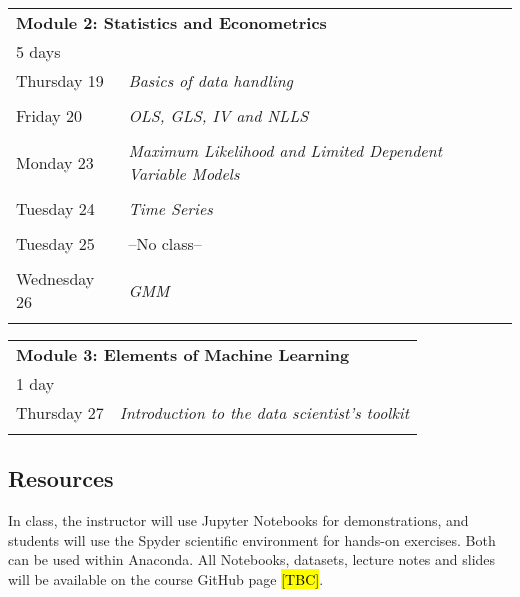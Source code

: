 \documentclass{article}
\numberwithin{equation}{section}
\begin{document}
\begin{center}
        \begin{tabular}{| p{2.5cm} | p{12.5cm} |}
    \hline
    \multicolumn{2}{|l|}{\textbf{Module 2: Statistics and Econometrics}} \\
    \multicolumn{2}{|l|}{5 days} \\
    \hline
    Thursday 19 & \textit{Basics of data handling} \\
        & \\
    Friday 20 & \textit{OLS, GLS, IV and NLLS}\\
        & \\
    Monday 23 & \textit{Maximum Likelihood and Limited Dependent Variable Models} \\
        & \\
    Tuesday 24 & \textit{Time Series}\\
        & \\
    Tuesday 25 & --No class--\\
        & \\
    Wednesday 26 & \textit{GMM} \\
        & \\
\hline
    \end{tabular}
\end{center}

\begin{center}
    \begin{tabular}{| p{2.5cm} | p{12.5cm} |}
    \hline
    \multicolumn{2}{|l|}{\textbf{Module 3: Elements of Machine Learning}} \\
    \multicolumn{2}{|l|}{1 day} \\
    \hline
    Thursday 27 & \textit{Introduction to the data scientist's toolkit} \\
        & \\
    \hline
    \end{tabular}

\end{center}

\begin{center}
    
\end{center}

\subsection*{Resources}

In class, the instructor will use Jupyter Notebooks for demonstrations, and students will use the Spyder scientific environment for hands-on exercises. Both can be used within Anaconda. All Notebooks, datasets, lecture notes and slides will be available on the course GitHub page \hl{[TBC]}.

\newpage 



\end{document}

